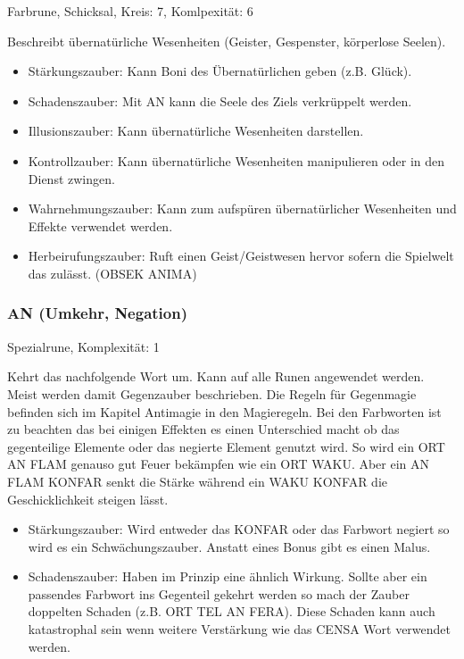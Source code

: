 \documentclass{article}
\begin{document}
Farbrune, Schicksal, Kreis: 7, Komlpexität: 6

Beschreibt übernatürliche Wesenheiten (Geister, Gespenster, körperlose Seelen).

\begin{itemize}
\item Stärkungszauber: Kann Boni des Übernatürlichen geben (z.B. Glück).
\item Schadenszauber: Mit AN kann die Seele des Ziels verkrüppelt werden.
\item Illusionszauber: Kann übernatürliche Wesenheiten darstellen.
\item Kontrollzauber: Kann übernatürliche Wesenheiten manipulieren oder in den Dienst zwingen.
\item Wahrnehmungszauber: Kann zum aufspüren übernatürlicher Wesenheiten und Effekte verwendet werden.
\item Herbeirufungszauber: Ruft einen Geist/Geistwesen hervor sofern die Spielwelt das zulässt. (OBSEK ANIMA)
\end{itemize}

\subsubsection{AN (Umkehr, Negation)}

Spezialrune, Komplexität: 1

Kehrt das nachfolgende Wort um. Kann auf alle Runen angewendet werden. Meist werden damit Gegenzauber beschrieben. Die
Regeln für Gegenmagie befinden sich im Kapitel Antimagie in den Magieregeln. Bei den Farbworten ist zu beachten das
bei einigen Effekten es einen Unterschied macht ob das gegenteilige Elemente oder das negierte Element genutzt wird.
So wird ein ORT AN FLAM genauso gut Feuer bekämpfen wie ein ORT WAKU. Aber ein AN FLAM KONFAR senkt die Stärke während
ein WAKU KONFAR die Geschicklichkeit steigen lässt.

\begin{itemize}
\item Stärkungszauber: Wird entweder das KONFAR oder das Farbwort negiert so wird es ein Schwächungszauber. Anstatt eines Bonus gibt es einen Malus.
\item Schadenszauber: Haben im Prinzip eine ähnlich Wirkung. Sollte aber ein passendes Farbwort ins Gegenteil gekehrt werden so mach der Zauber doppelten Schaden (z.B. ORT TEL AN FERA). Diese Schaden kann auch katastrophal sein wenn weitere Verstärkung wie das CENSA Wort verwendet werden.
\end{itemize}
\end{document}
